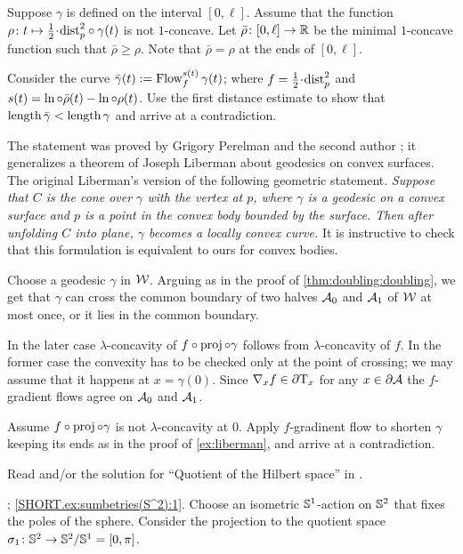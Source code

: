Suppose $\gamma$ is defined on the interval $[0,\ell]$.
Assume that the function $\rho\:t\mapsto \tfrac12\cdot\distfun_p^2\circ\gamma(t)$ is not $1$-concave.
Let $\bar\rho\colon[0,\ell]\to\mathbb{R}$ be the minimal $1$-concave function such that $\bar\rho\ge \rho$.
Note that $\bar\rho=\rho$ at the ends of $[0,\ell]$.

Consider the curve $\bar\gamma(t)\mathrel{:=} \mathop{\rm Flow}\nolimits_f^{s(t)}\gamma(t)$;
where $f=\tfrac12\cdot\distfun_p^2$ and $s(t)=\ln\circ\bar\rho(t)-\ln\circ\rho(t)$.
Use the first distance estimate to show that $\mathop{\rm length}\nolimits\bar\gamma<\mathop{\rm length}\nolimits\gamma$ and arrive at a contradiction.

The statement was proved by Grigory Perelman and the second author \cite{perelman-petrunin};
it generalizes a theorem of Joseph Liberman \cite{liberman} about geodesics on convex surfaces.
The original Liberman's version of the following geometric statement.
\textit{Suppose that $C$ is the cone over $\gamma$ with the vertex at $p$,
where $\gamma$ is a geodesic on a convex surface and $p$ is a point in the convex body bounded by the surface.
Then after unfolding $C$ into plane, $\gamma$ becomes a locally convex curve.}
It is instructive to check that this formulation is equivalent to ours for convex bodies.

Choose a geodesic $\gamma$ in $\mathcal{W}$.
Arguing as in the proof of \ref{thm:doubling:doubling}, we get 
that $\gamma$ can cross the common boundary of two halves $\mathcal{A}_0$ and $\mathcal{A}_1$ of $\mathcal{W}$ at most once, or it lies in the common boundary.

In the later case $\lambda$-concavity of $f\circ\operatorname{\rm proj}\nolimits\circ\gamma$ follows from $\lambda$-concavity of $f$.
In the former case the convexity has to be checked only at the point of crossing;
we may assume that it happens at $x=\gamma(0)$.
Since $\nabla_xf\in\partial\mathrm{T}_x$ for any $x\in\partial\mathcal{A}$ the $f$-gradient flows agree on $\mathcal{A}_0$ and $\mathcal{A}_1$.

Assume $f\circ\operatorname{\rm proj}\nolimits\circ\gamma$ is not $\lambda$-concavity at $0$.
Apply $f$-gradinent flow to shorten $\gamma$ keeping its ends as in the proof of \ref{ex:liberman},
and arrive at a contradiction.

 Read \cite[Section 4]{terng-thorbergsson} and/or the solution for ``Quotient of the Hilbert space'' in \cite{petrunin2020}.

\parbf{\ref{ex:sumbetries(S^2)}}; \ref{SHORT.ex:sumbetries(S^2):1}.
Choose an isometric $\mathbb{S}^1$-action on $\mathbb{S}^2$ that fixes the poles of the sphere.
Consider the projection to the quotient space $\sigma_1\colon\mathbb{S}^2\to \mathbb{S}^2/\mathbb{S}^1=[0,\pi]$.

